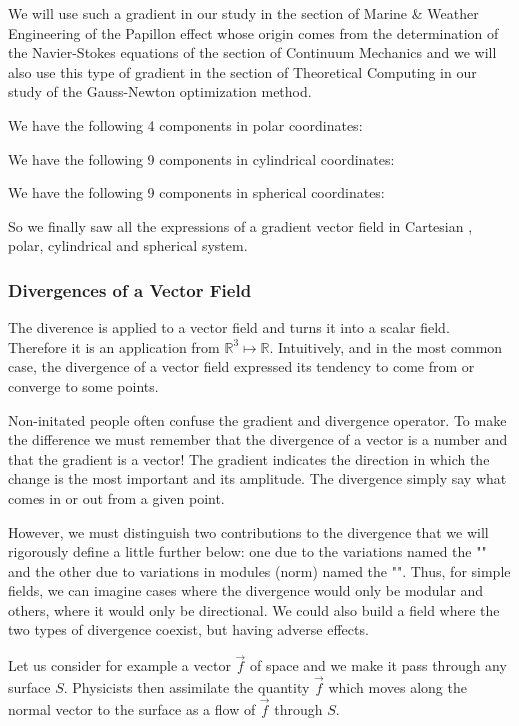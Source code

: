 	 We will use such a gradient in our study in the section of Marine \& Weather Engineering of the Papillon effect whose origin comes from the determination of the Navier-Stokes equations of the section of Continuum Mechanics and we will also use this type of gradient in the section of Theoretical Computing in our study of the Gauss-Newton optimization method.
	
	We have the following 4 components in polar coordinates:
	 
	We have the following 9 components in cylindrical coordinates:
	 
	We have the following 9 components in spherical coordinates:
	 
	 So we finally saw all the expressions of a gradient vector field in Cartesian , polar, cylindrical and spherical system.
	 
	\subsubsection{Divergences of a Vector Field}\label{divergence vector field}
	The diverence is applied to a vector field and turns it into a scalar field. Therefore it is an application from $\mathbb{R}^3\mapsto \mathbb{R}$. Intuitively, and in the most common case, the divergence of a vector field expressed its tendency to come from or converge to some points.
	\begin{tcolorbox}[title=Remark,colframe=black,arc=10pt]
	Non-initated people often confuse the gradient and divergence operator. To make the difference we must remember that the divergence of a vector is a number and that the gradient is a vector! The gradient indicates the direction in which the change is the most important and its amplitude. The divergence simply say what comes in or out from a given point.
	\end{tcolorbox}	
	However, we must distinguish two contributions to the divergence that we will rigorously define a little further below: one due to the variations named the "" and the other due to variations in modules (norm) named the "". Thus, for simple fields, we can imagine cases where the divergence would only be modular and others, where it would only be directional. We could also build a field where the two types of divergence coexist, but having adverse effects.
	
	Let us consider for example a vector $\vec{f}$ of space and we make it pass through any surface $S$. Physicists then assimilate the quantity $\vec{f}$ which moves along the normal vector to the surface as a flow of $\vec{f}$ through $S$.
	
